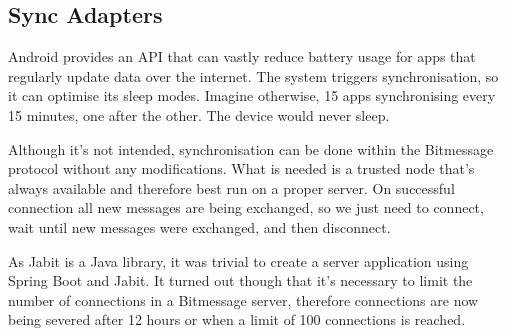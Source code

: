 \documentclass{bfh}
\begin{document}
  \subsection{Sync Adapters}
  Android provides an API that can vastly reduce battery usage for apps that regularly update data over the internet. The system triggers synchronisation, so it can optimise its sleep modes. Imagine otherwise, 15 apps synchronising every 15 minutes, one after the other. The device would never sleep.

  Although it's not intended, synchronisation can be done within the Bitmessage protocol without any modifications. What is needed is a trusted node that's always available and therefore best run on a proper server. On successful connection all new messages are being exchanged, so we just need to connect, wait until new messages were exchanged, and then disconnect.

  As Jabit is a Java library, it was trivial to create a server application using Spring Boot and Jabit. It turned out though that it's necessary to limit the number of connections in a Bitmessage server, therefore connections are now being severed after 12 hours or when a limit of 100 connections is reached.

  
  
\end{document}
